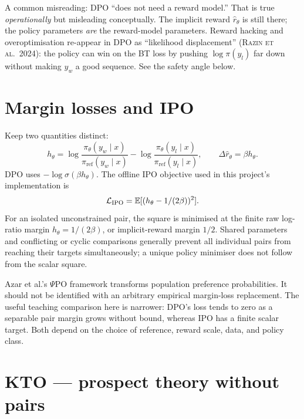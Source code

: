 \documentclass[11pt,oneside]{scrbook}
\begin{document}
\begin{pitfall}
A common misreading: DPO ``does not need a reward model.'' That is
true \emph{operationally} but misleading conceptually. The implicit
reward $\hat r_\theta$ is still there; the policy parameters
\emph{are} the reward-model parameters. Reward hacking and
overoptimisation re-appear in DPO as ``likelihood displacement''
(\textsc{Razin et al.\ 2024}): the policy can win on the BT loss by
pushing $\log\pi(y_l)$ far down without making $y_w$ a good
sequence. See the safety angle below.
\end{pitfall}

\section{Margin losses and IPO}

Keep two quantities distinct:
\[
 h_\theta = \log\frac{\pi_\theta(y_w\mid x)}{\pi_{\mathrm{ref}}(y_w\mid x)}
             -\log\frac{\pi_\theta(y_l\mid x)}{\pi_{\mathrm{ref}}(y_l\mid x)},
 \qquad \Delta\hat r_\theta=\beta h_\theta.
\]
DPO uses $-\log\sigma(\beta h_\theta)$.
The offline IPO objective used in this project's implementation is
\begin{equation}
 \mathcal L_{\mathrm{IPO}}=\mathbb{E}[(h_\theta-1/(2\beta))^2].
 \label{eq:ipo}
\end{equation}
For an isolated unconstrained pair, the square is minimised at the finite
raw log-ratio margin $h_\theta=1/(2\beta)$, or implicit-reward margin $1/2$.
Shared parameters and conflicting or cyclic comparisons generally prevent
all individual pairs from reaching their targets simultaneously; a unique
policy minimiser does not follow from the scalar square.

Azar et al.'s $\Psi$PO framework transforms population preference
probabilities. It should not be identified with an arbitrary empirical
margin-loss replacement. The useful teaching comparison here is narrower:
DPO's loss tends to zero as a separable pair margin grows without bound,
whereas IPO has a finite scalar target. Both depend on the choice of
reference, reward scale, data, and policy class.

\section{KTO --- prospect theory without pairs}
\end{document}
